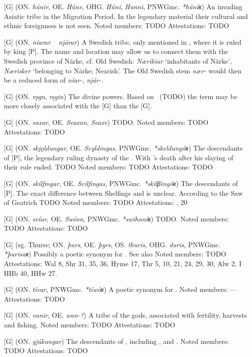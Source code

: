 \begin{itemize}
[G] (ON. \emph{húnir}, OE. \emph{Húne}, OHG. \emph{Húni}, \emph{Hunni}, PNWGmc. \emph{*húníʀ})
  An invading Asiatic tribe in the Migration Period. In the legendary material their cultural and ethnic foreignness is not seen.
  Noted members: TODO
  Attestations: TODO

[G] (ON. \emph{níarar} ~ \emph{njárar})
  A Swedish tribe, only mentioned in \Volundarkvida, where it is ruled by king [P]. The name and location may allow us to connect them with the Swedish province of Närke, cf. Old Swedish: \emph{Nærikiar} ‘inhabitants of Närke’, \emph{Nærisker} ‘belonging to Närke; Nearish’. The Old Swedish stem \emph{nær-} would then be a reduced form of \emph{níar-}, \emph{njár-}.

[G] (ON. \emph{rǫgn}, \emph{ręgin})
  The divine powers. Based on \Vafthrudnismal\ (TODO) the term may be more closely associated with the [G] than the [G].

[G] (ON. \emph{saxar}, OE. \emph{Seaxan}, \emph{Seaxe})
  TODO.
  Noted members: TODO
  Attestations: TODO

[G] (ON. \emph{skjǫldungar}, OE. \emph{Scyldingas}, PNWGmc. \emph{*skeldungóʀ})
  The descendants of [P], the legendary ruling dynasty of the . With 's death after his slaying of  their rule ended. TODO
  Noted members: TODO
  Attestations: TODO

[G] (ON. \emph{skilfingar}, OE. \emph{Scilfingas}, PNWGmc. \emph{*skilβingóʀ})
  The descendants of [P]. The exact difference between Shelfings and  is unclear. According to the Saw of Geatrich TODO
  Noted members: TODO
  Attestations: , 20

[G] (ON. \emph{svíar}, OE. \emph{Swéon}, PNWGmc. \emph{*swihaníʀ})
  TODO.
  Noted members: TODO
  Attestations: TODO

[G] (sg. Thurse; ON. \emph{þurs}, OE. \emph{þyrs}, OS. \emph{thuris}, OHG. \emph{duris}, PNWGmc. \emph{*þurisaʀ})
  Possibly a poetic synonym for . See also 
  Noted members: TODO
  Attestations: Wal 8, Shr 31, 35, 36, Hyme 17, Thr 5, 10, 21, 24, 29, 30, Alw 2, I HHb 40, HHw 27.

[G] (ON. \emph{tívar}, PNWGmc. \emph{*tíwóʀ})
  A poetic synonym for .
  Noted members: —
  Attestations: TODO

[G] (ON. \emph{vanir}, OE. \emph{wan-?})
  A tribe of the gods, associated with fertility, harvests and fishing.
  Noted members: TODO
  Attestations: TODO

[G] (ON. \emph{gjúkungar})
  The descendants of , including ,  and .
  Noted members: TODO
  Attestations: TODO

\end{itemize}
